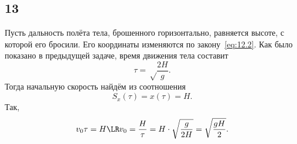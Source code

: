 \subsection{13}

Пусть дальность полёта тела, брошенного горизонтально, равняется высоте, с которой его бросили. Его координаты изменяются по закону~\eqref{eq:12.2}. Как было показано в предыдущей задаче, время движения тела составит
\[
\tau=\sqrt\frac{2H}{g}.
\]
Тогда начальную скорость найдём из соотношения
\[
S_x(\tau)=x(\tau)=H.
\]
Так,
\[
v_0\tau=H\LR v_0=\frac{H}{\tau}=H\cdot\sqrt\frac{g}{2H}=\sqrt\frac{gH}{2}.
\]